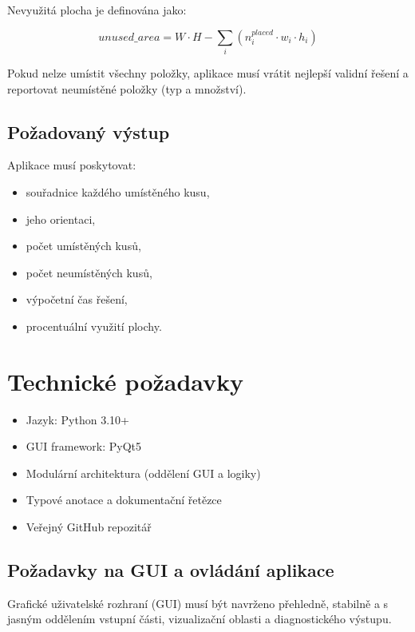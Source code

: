 \documentclass[12pt,a4paper]{article}
\begin{document}
Nevyužitá plocha je definována jako:

\begin{equation}
unused\_area = W \cdot H - \sum_i (n_i^{placed} \cdot w_i \cdot h_i)
\label{eq:unused_area}
\end{equation}

Pokud nelze umístit všechny položky, aplikace musí vrátit nejlepší validní řešení a reportovat neumístěné položky (typ a množství).

\subsection{Požadovaný výstup}

Aplikace musí poskytovat:

\begin{itemize}
    \item souřadnice každého umístěného kusu,
    \item jeho orientaci,
    \item počet umístěných kusů,
    \item počet neumístěných kusů,
    \item výpočetní čas řešení,
    \item procentuální využití plochy.
\end{itemize}

\section{Technické požadavky}

\begin{itemize}
    \item Jazyk: Python 3.10+
    \item GUI framework: PyQt5
    \item Modulární architektura (oddělení GUI a logiky)
    \item Typové anotace a dokumentační řetězce
    \item Veřejný GitHub repozitář
\end{itemize}

\subsection{Požadavky na GUI a ovládání aplikace}

Grafické uživatelské rozhraní (GUI) musí být navrženo
přehledně, stabilně a s jasným oddělením vstupní části,
vizualizační oblasti a diagnostického výstupu.
\end{document}
